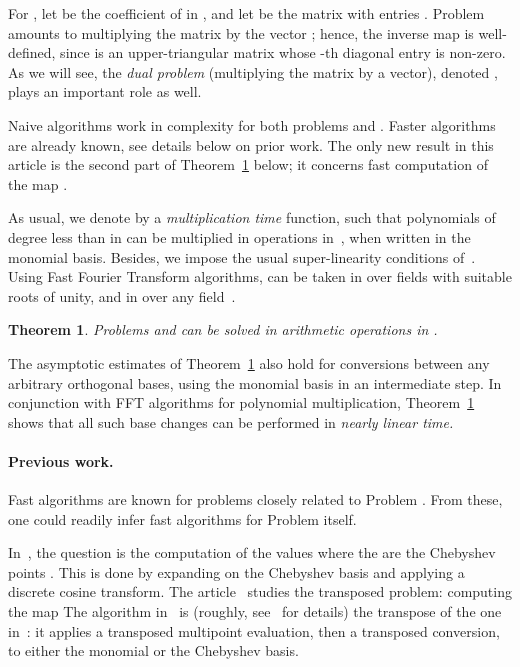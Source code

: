 \documentclass{elsart}
\newtheorem{Theorem}{Theorem}
\begin{document}
\medskip
For , let  be the coefficient of  in ,
and let  be the  matrix with entries
. Problem  amounts to multiplying the
matrix  by the vector ;
hence, the inverse map  is well-defined, since  is an
upper-triangular matrix whose -th diagonal entry  is non-zero. As we will see, the {\it dual problem}
(multiplying the matrix  by a vector), denoted
, plays an important role as well.

Naive algorithms work in complexity  for both problems 
and . Faster algorithms are already known, see details below on
prior work. The only new result in this article is the second part of
Theorem~\ref{Theo:1} below; it concerns fast computation of the map . 

As usual, we denote by  a \emph{multiplication time} function,
such that polynomials of degree less than  in  can be
multiplied in  operations in~, when written in the monomial
basis. Besides, we impose the usual super-linearity conditions
of~\cite[Chap.~8]{GaGe99}.  Using Fast Fourier Transform algorithms,
 can be taken in  over fields with suitable roots
of unity, and in  over any
field~\cite{ScSt71,CaKa91}.

\begin{Theorem}\label{Theo:1}
  Problems \emph{} and \emph{} can be solved in
   arithmetic operations in .
\end{Theorem}

The asymptotic estimates of Theorem~\ref{Theo:1} also hold for
conversions between any arbitrary orthogonal bases, using the monomial
basis in an intermediate step. In conjunction with FFT algorithms for
polynomial multiplication, Theorem~\ref{Theo:1} shows that all such
base changes can be performed in \emph{nearly linear time.}




\paragraph*{Previous work.} 
Fast algorithms are known for problems closely related to Problem
. {}From these, one could readily infer fast algorithms for
Problem  itself.

In~\cite{PoStTa98}, the question is the computation of the values
 where the  are the
Chebyshev points . This is done by expanding
 on the Chebyshev basis and applying a
discrete cosine transform. The article~\cite{DrHeRo97} studies the
transposed problem: computing the map
 The algorithm in~\cite{DrHeRo97} is
(roughly, see~\cite{PoStTa98} for details) the transpose of the one
in~\cite{PoStTa98}: it applies a transposed multipoint evaluation, then 
a transposed conversion, to either the monomial or the Chebyshev basis.
\end{document}
